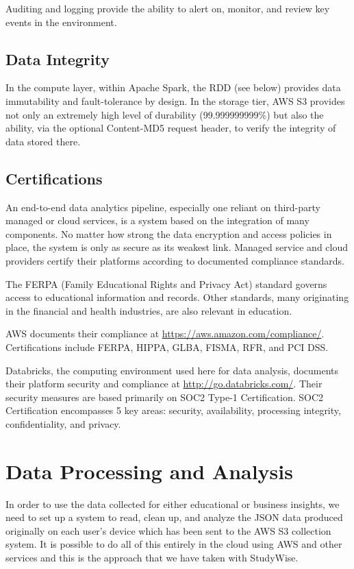 \documentclass[runningheads,a4paper]{llncs}
\begin{document}
Auditing and logging provide the ability to alert on, monitor, and review key events in the environment.

\subsection{Data Integrity}

In the compute layer, within Apache Spark, the RDD (see below) provides data immutability and fault-tolerance by design. In the storage tier, AWS S3 provides not only an extremely high level of durability (99.999999999\%) but also the ability, via the optional Content-MD5 request header, to verify the integrity of data stored there.

\subsection{Certifications}

An end-to-end data analytics pipeline, especially one reliant on third-party managed or cloud services, is a system based on the integration of many components. No matter how strong the data encryption and access policies in place, the system is only as secure as its weakest link. Managed service and cloud providers certify their platforms according to documented compliance standards. 

The FERPA (Family Educational Rights and Privacy Act) standard governs access to educational information and records. Other standards, many originating in the financial and health industries, are also relevant in education.

AWS documents their compliance at \url{https://aws.amazon.com/compliance/}. Certifications include FERPA, HIPPA, GLBA, FISMA, RFR, and PCI DSS.

Databricks, the computing environment used here for data analysis, documents their platform security and compliance at \url{http://go.databricks.com/}.  Their security measures are based primarily on SOC2 Type-1 Certification. SOC2 Certification encompasses 5 key areas: security, availability, processing integrity, confidentiality, and privacy.
    
\section{Data Processing and Analysis}

In order to use the data collected for either educational or business insights, we need to set up a system to read, clean up, and analyze the JSON data produced originally on each user's device which has been sent to the AWS S3 collection system.  It is possible to do all of this entirely in the cloud using AWS and other services and this is the approach that we have taken with StudyWise.
\end{document}
